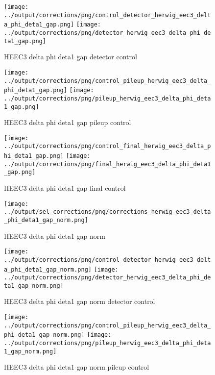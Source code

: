 \documentclass[11pt]{book}
\begin{document}
\begin{figure}[ht]
\centering
\texttt{[image: ../output/corrections/png/control\_detector\_herwig\_eec3\_delta\_phi\_deta1\_gap.png]}
\texttt{[image: ../output/corrections/png/detector\_herwig\_eec3\_delta\_phi\_deta1\_gap.png]}
\caption{HEEC3 delta phi deta1 gap detector control}
\label{fig:HEEC3_delta_phi_deta1_gap_detector_control}
\end{figure}

\begin{figure}[ht]
\centering
\texttt{[image: ../output/corrections/png/control\_pileup\_herwig\_eec3\_delta\_phi\_deta1\_gap.png]}
\texttt{[image: ../output/corrections/png/pileup\_herwig\_eec3\_delta\_phi\_deta1\_gap.png]}
\caption{HEEC3 delta phi deta1 gap pileup control}
\label{fig:HEEC3_delta_phi_deta1_gap_pileup_control}
\end{figure}


\begin{figure}[ht]
\centering
\texttt{[image: ../output/corrections/png/control\_final\_herwig\_eec3\_delta\_phi\_deta1\_gap.png]}
\texttt{[image: ../output/corrections/png/final\_herwig\_eec3\_delta\_phi\_deta1\_gap.png]}
\caption{HEEC3 delta phi deta1 gap final control}
\label{fig:HEEC3_delta_phi_deta1_gap_final_control}
\end{figure}


\begin{figure}[ht]
\centering
\texttt{[image: ../output/sel\_corrections/png/corrections\_herwig\_eec3\_delta\_phi\_deta1\_gap\_norm.png]}
\caption{HEEC3 delta phi deta1 gap norm}
\label{fig:HEEC3_delta_phi_deta1_gap_norm}
\end{figure}

\begin{figure}[ht]
\centering
\texttt{[image: ../output/corrections/png/control\_detector\_herwig\_eec3\_delta\_phi\_deta1\_gap\_norm.png]}
\texttt{[image: ../output/corrections/png/detector\_herwig\_eec3\_delta\_phi\_deta1\_gap\_norm.png]}
\caption{HEEC3 delta phi deta1 gap norm detector control}
\label{fig:HEEC3_delta_phi_deta1_gap_norm_detector_control}
\end{figure}

\begin{figure}[ht]
\centering
\texttt{[image: ../output/corrections/png/control\_pileup\_herwig\_eec3\_delta\_phi\_deta1\_gap\_norm.png]}
\texttt{[image: ../output/corrections/png/pileup\_herwig\_eec3\_delta\_phi\_deta1\_gap\_norm.png]}
\caption{HEEC3 delta phi deta1 gap norm pileup control}
\label{fig:HEEC3_delta_phi_deta1_gap_norm_pileup_control}
\end{figure}
\end{document}
